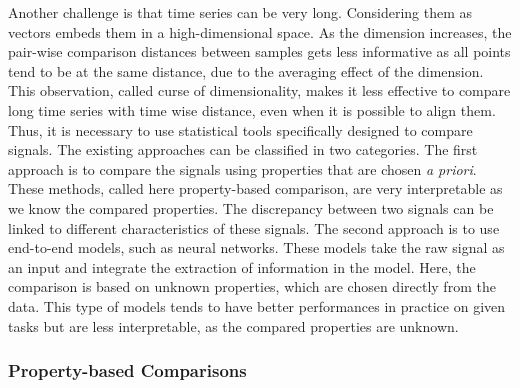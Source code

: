 \documentclass[../thesis.tex]{subfiles}
\begin{document}
Another challenge is that time series can be very long. Considering them as vectors embeds them in a high-dimensional space. As the dimension increases, the pair-wise comparison distances between samples gets less informative as all points tend to be at the same distance, due to the averaging effect of the dimension. This observation, called curse of dimensionality, makes it less effective to compare long time series with time wise distance, even when it is possible to align them. Thus, it is necessary to use statistical tools specifically designed to compare signals. The existing approaches can be classified in two categories. The first approach is to compare the signals using properties that are chosen \emph{a priori}. These methods, called here property-based comparison, are very interpretable as we know the compared properties. The discrepancy between two signals can be linked to different characteristics of these signals. The second approach is to use end-to-end models, such as neural networks. These models take the raw signal as an input and integrate the extraction of information in the model. Here, the comparison is based on unknown properties, which are chosen directly from the data. This type of models tends to have better performances in practice on given tasks but are less interpretable, as the compared properties are unknown.



\subsubsection{Property-based Comparisons}
\label{ssub:ts:feat_comp}
\end{document}
